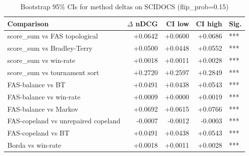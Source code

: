 \begin{table}[ht]
\centering
\caption{Bootstrap 95\% CIs for method deltas on SCIDOCS (flip\_prob=0.15)}
\label{tab:bootstrap_scidocs}
\begin{tabular}{lrrrl}
\toprule
Comparison & $\Delta$ nDCG & CI low & CI high & Sig. \\
\midrule
score\_sum vs FAS topological & +0.0642 & +0.0600 & +0.0686 & *** \\
score\_sum vs Bradley-Terry & +0.0500 & +0.0448 & +0.0552 & *** \\
score\_sum vs win-rate & +0.0018 & +0.0011 & +0.0028 & *** \\
score\_sum vs tournament sort & +0.2720 & +0.2597 & +0.2849 & *** \\
FAS-balance vs BT & +0.0491 & +0.0438 & +0.0543 & *** \\
FAS-balance vs win-rate & +0.0009 & +0.0000 & +0.0019 & *** \\
FAS-balance vs Markov & +0.0692 & +0.0615 & +0.0766 & *** \\
FAS-copeland vs unrepaired copeland & -0.0007 & -0.0012 & -0.0003 & *** \\
FAS-copeland vs BT & +0.0491 & +0.0438 & +0.0543 & *** \\
Borda vs win-rate & +0.0018 & +0.0011 & +0.0028 & *** \\
\bottomrule
\end{tabular}
\end{table}